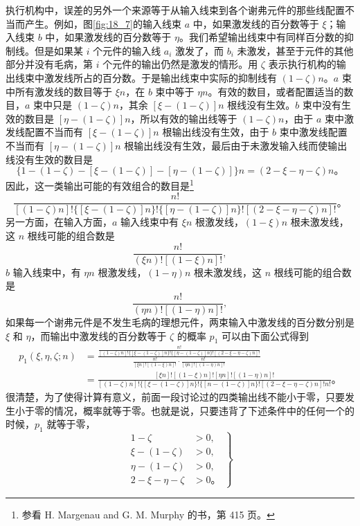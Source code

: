 执行机构中，误差的另外一个来源等于从输入线束到各个谢弗元件的那些线配置不当而产生。例如，图\ref{fig:18_7}的输入线束 $a$ 中，如果激发线的百分数等于 $\xi$；输入线束 $b$ 中，如果激发线的百分数等于 $\eta$。我们希望输出线束中有同样百分数的抑制线。但是如果某 $i$ 个元件的输入线 $a_i$ 激发了，而 $b_i$ 未激发，甚至于元件的其他部分并没有毛病，第 $i$ 个元件的输出仍然是激发的情形。用 $\zeta$ 表示执行机构的输出线束中激发线所占的百分数。于是输出线束中实际的抑制线有 $(1-\zeta)n$。$a$ 束中所有激发线的数目等于 $\xi n$，在 $b$ 束中等于 $\eta n$。有效的数目，或者配置适当的数目，$a$ 束中只是 $(1-\zeta)n$，其余 $[\xi-(1-\zeta)]n$ 根线没有生效。$b$ 束中没有生效的数目是 $[\eta-(1-\zeta)]n$，所以有效的输出线等于 $(1-\zeta)n$，由于 $a$ 束中激发线配置不当而有 $[\xi-(1-\zeta)]n$ 根输出线没有生效，由于 $b$ 束中激发线配置不当而有 $[\eta-(1-\zeta)]n$ 根输出线没有生效，最后由于未激发输入线而使输出线没有生效的数目是
\begin{equation*}
\{1-(1-\zeta)-[\xi-(1-\zeta)]-[\eta-(1-\zeta)]\}n = (2-\xi-\eta-\zeta)n。
\end{equation*}
因此，这一类输出可能的有效组合的数目是\footnote{参看 H. Margenau and G. M. Murphy 的书，第 415 页。}
\begin{equation*}
\frac{n!}{[(1-\zeta)n]!\{[\xi-(1-\zeta)]n\}!\{[\eta-(1-\zeta)]n\}![(2-\xi-\eta-\zeta)n]!}。
\end{equation*}
另一方面，在输入方面，$a$ 输入线束中有 $\xi n$ 根激发线，$(1-\xi)n$ 根未激发线，这 $n$ 根线可能的组合数是
\begin{equation*}
\frac{n!}{(\xi n)![(1-\xi)n]!},
\end{equation*}
$b$ 输入线束中，有 $\eta n$ 根激发线，$(1-\eta)n$ 根未激发线，这 $n$ 根线可能的组合数是
\begin{equation*}
\frac{n!}{(\eta n)![(1-\eta)n]!},
\end{equation*}
如果每一个谢弗元件是不发生毛病的理想元件，两束输入中激发线的百分数分别是 $\xi$ 和 $\eta$，而输出中激发线的百分数等于 $\zeta$ 的概率 $p_1$ 可以由下面公式得到
\begin{equation}
\begin{aligned}
p_1(\xi,\eta,\zeta;n) &= \frac{\displaystyle \frac{n!}{[(1-\zeta)n]!\{[\xi-(1-\zeta)]n\}!\{[\eta-(1-\zeta)]n\}![(2-\xi-\eta-\zeta)n]!}}{\displaystyle \frac{n!}{[\xi n]![(1-\xi)n]!} \cdot \frac{n!}{[\eta n]![(1-\eta)n]!}} \\
&= \frac{[\xi n]![(1-\xi)n]![\eta n]![(1-\eta)n]!}{[(1-\zeta)n]!\{[\xi-(1-\zeta)]n\}!\{[n-(1-\zeta)]n\}![(2-\xi-\eta-\zeta)n]!n!}。
\end{aligned}
\label{eq:ch18_ideal_exec_prob_p1}
\end{equation}
很清楚，为了使得计算有意义，前面一段讨论过的四类输出线不能小于零，只要发生小于零的情况，概率就等于零。也就是说，只要违背了下述条件中的任何一个的时候，$p_1$ 就等于零，
\begin{equation}
\left.
\begin{aligned}
1-\zeta &> 0, \\
\xi-(1-\zeta) &> 0, \\
\eta-(1-\zeta) &> 0, \\
2-\xi-\eta-\zeta &> 0。
\end{aligned}
\right\}
\label{eq:ch18_valid_range_inequalities}
\end{equation}


